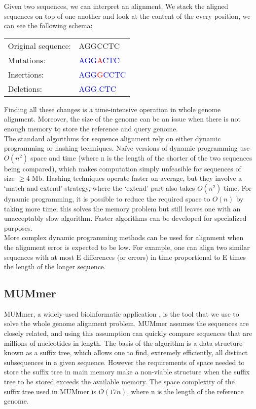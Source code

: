 \documentclass[10pt]{bmc_article}
\newenvironment{bmcformat}{\begin{raggedright}\baselineskip20pt\sloppy\setboolean{publ}{false}}{\end{raggedright}\baselineskip20pt\sloppy}
\begin{document}
\begin{bmcformat}
Given two sequences, we can interpret an alignment. We stack the aligned sequences on top of one another and look at the content of the every position, we can see the following schema:
\begin{center}
\begin{tabular}{l l}
Original sequence:& AGGCCTC \\
Mutations:& \textcolor{blue}{AGG}\textcolor{red}{A}\textcolor{blue}{CTC} \\
Insertions:& \textcolor{blue}{AGG}\textcolor{red}{G}\textcolor{blue}{CCTC} \\
Deletions:& \textcolor{blue}{AGG}\textcolor{green}{.}\textcolor{blue}{CTC} \\
\end{tabular}
\end{center}
Finding all these changes is a time-intensive operation in whole genome alignment. Moreover, the size of the genome can be an issue when there is not enough memory to store the reference and query genome.\\
The standard algorithms for sequence alignment rely on either dynamic programming or hashing techniques. Naïve versions of dynamic programming use $O(n^2)$ space and time (where n is the length of the shorter of the two sequences being compared), which makes computation simply unfeasible for sequences of size $\ge 4$ Mb. Hashing techniques operate faster on average, but they involve a ‘match and extend’ strategy, where the ‘extend’ part also takes $O(n^2)$ time. For dynamic programming, it is possible to reduce the required space to $O(n)$ by taking more time; this solves the memory problem but still leaves one with an unacceptably slow algorithm. Faster algorithms can be developed for specialized purposes.\\
More complex dynamic programming methods can be used for alignment when the alignment error is expected to be low. For example, one can align two similar sequences with at most E differences (or errors) in time proportional to E times the length of the longer sequence.
\subsection{MUMmer}
MUMmer, a widely-used bioinformatic application \cite{Delcher1999,Delcher2002,Delcher2003}, is the tool that we use to solve the whole genome alignment problem. MUMmer assumes the sequences are closely related, and using this assumption can quickly compare sequences that are millions of nucleotides in length. The basis of the algorithm is a data structure known as a suffix tree, which allows one to find, extremely efficiently, all distinct subsequences in a given sequence. However the requirements of space needed to store the suffix tree in main memory make a non-viable structure when the suffix tree to be stored exceeds the available memory. The space complexity of the suffix tree used in MUMmer is $O(17n)$, where n is the length of the reference genome.\\


\end{bmcformat}
\end{document}
